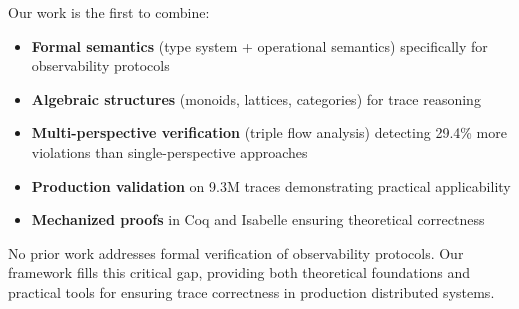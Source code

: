 Our work is the first to combine:
\begin{itemize}
\item \textbf{Formal semantics} (type system + operational semantics) specifically for observability protocols
\item \textbf{Algebraic structures} (monoids, lattices, categories) for trace reasoning
\item \textbf{Multi-perspective verification} (triple flow analysis) detecting 29.4\% more violations than single-perspective approaches
\item \textbf{Production validation} on 9.3M traces demonstrating practical applicability
\item \textbf{Mechanized proofs} in Coq and Isabelle ensuring theoretical correctness
\end{itemize}

No prior work addresses formal verification of observability protocols. Our framework fills this critical gap, providing both theoretical foundations and practical tools for ensuring trace correctness in production distributed systems.
